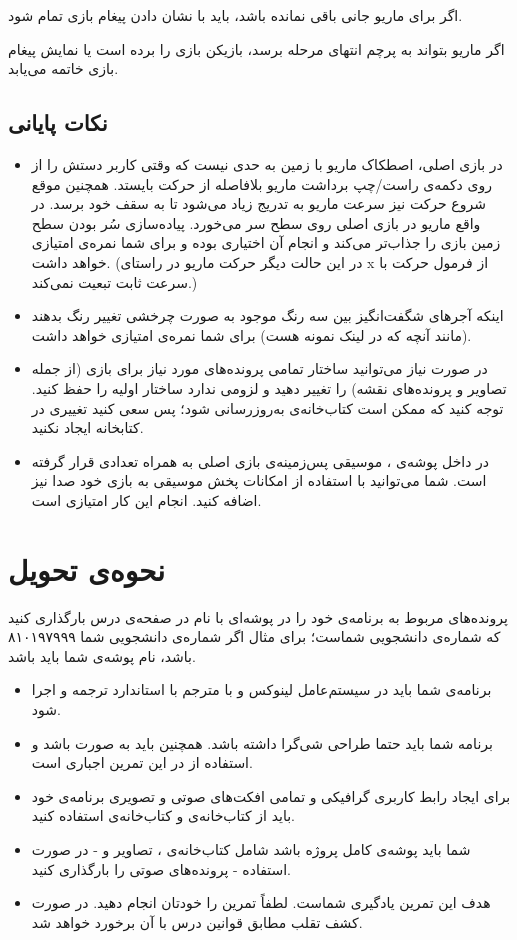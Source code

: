 \documentclass{utap}
\begin{document}
اگر برای ماریو جانی باقی نمانده باشد، باید با نشان دادن پیغام  بازی تمام شود.

اگر ماریو بتواند به پرچم انتهای مرحله برسد، بازیکن بازی را برده است یا نمایش پیغام  بازی خاتمه می‌یابد.
	\subsection{نکات پایانی}
	\begin{itemize}
		\item
در بازی اصلی، اصطکاک ماریو با زمین به حدی نیست که وقتی کاربر دستش را از روی دکمه‌ی راست/چپ برداشت ماریو بلافاصله از حرکت بایستد. همچنین موقع شروع حرکت نیز سرعت ماریو به تدریج زیاد می‌شود تا به سقف خود برسد. در واقع ماریو در بازی اصلی روی سطح سر می‌خورد. پیاده‌سازی سُر بودن سطح زمین بازی را جذاب‌تر می‌کند و انجام آن اختیاری بوده و برای شما نمره‌ی امتیازی خواهد داشت. (در این حالت دیگر حرکت ماریو در راستای x از فرمول حرکت با سرعت ثابت تبعیت نمی‌کند.)
		\item
اینکه آجر‌های شگفت‌انگیز بین سه رنگ موجود به صورت چرخشی تغییر رنگ بدهند (مانند آنچه که در لینک نمونه هست) برای شما نمره‌ی امتیازی خواهد داشت.
		\item
در صورت نیاز می‌توانید ساختار تمامی پرونده‌های مورد نیاز برای بازی (از جمله تصاویر و پرونده‌های نقشه) را تغییر دهید و لزومی ندارد ساختار اولیه را حفظ کنید.
توجه کنید که ممکن است کتاب‌خانه‌ی  به‌روزرسانی شود؛ پس سعی کنید تغییری در کتابخانه ایجاد نکنید.
		\item
در داخل پوشه‌ی ، موسیقی پس‌زمینه‌ی بازی اصلی به همراه تعدادی  قرار گرفته است. شما می‌توانید با استفاده از امکانات پخش موسیقی  به بازی خود صدا نیز اضافه کنید. انجام این کار امتیازی است.
	\end{itemize}

\section{نحوه‌ی تحویل}
    پرونده‌‌های مربوط به برنامه‌ی خود را در پوشه‌ای با نام  در صفحه‌ی  درس بارگذاری کنید که  شماره‌ی دانشجویی شماست؛ برای مثال اگر شماره‌ی دانشجویی شما ۸۱۰۱۹۷۹۹۹ باشد، نام پوشه‌ی شما باید  باشد.
    \begin{itemize}
        \item
برنامه‌ی شما باید در سیستم‌عامل لینوکس و با مترجم  با استاندارد  ترجمه و اجرا شود.
	\item
برنامه شما باید حتما طراحی شی‌گرا داشته باشد. همچنین باید به صورت  باشد و استفاده از  در این تمرین اجباری است.
	\item
برای ایجاد رابط کاربری گرافیکی و تمامی افکت‌های صوتی و تصویری برنامه‌ی خود باید از کتاب‌خانه‌ی  و کتاب‌خانه‌ی  استفاده کنید.
        \item
شما باید پوشه‌ی کامل پروژه باشد شامل کتاب‌خانه‌ی ، تصاویر و - در صورت استفاده - پرونده‌های صوتی را بارگذاری کنید.
        \item
هدف این تمرین یادگیری شماست. لطفاً تمرین را خودتان انجام دهید. در صورت کشف تقلب مطابق قوانین درس با آن برخورد خواهد شد.
    \end{itemize}
\end{document}
